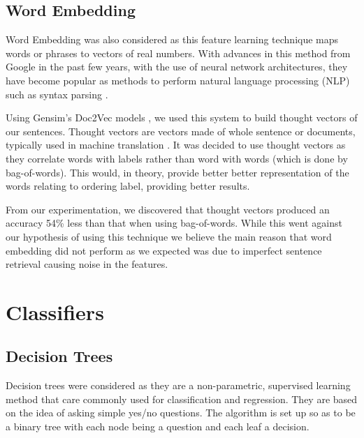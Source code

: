 \documentclass[bsc,frontabs,twoside,singlespacing,parskip,deptreport]{infthesis}     %
\begin{document}



\subsection{Word Embedding} \label{sec:word-embedding}
Word Embedding was also considered as this feature learning technique maps words or phrases to vectors of real numbers.
With advances in this method from Google in the past few years, with the use of neural network architectures, they have become
popular as methods to perform natural language processing (NLP) such as syntax parsing \cite{socher2013parsing}.

Using Gensim's Doc2Vec models \cite{rehurek_lrec}, we used this system to build thought vectors of our sentences.
Thought vectors are vectors made of whole sentence or documents, typically used in machine translation \cite{deeplearning4j}.
It was decided to use thought vectors as they correlate words with labels rather than word with words (which is done by bag-of-words).
This would, in theory, provide better better representation of the words relating to ordering label, providing better results.



From our experimentation, we discovered that thought vectors produced an accuracy 54\% less than that when
using bag-of-words. While this went against our hypothesis of using this technique we believe
the main reason that word embedding did not perform as we expected was due to imperfect sentence retrieval causing noise in
the features.

\section{Classifiers}\label{sec:classifiers}
\subsection{Decision Trees}
Decision trees were considered as they are a non-parametric, supervised learning method that care commonly used for
classification and regression.
They are based on the idea of asking simple yes/no questions. The algorithm is set up so as to be a binary tree with
each node being a question and each leaf a decision.
\end{document}
